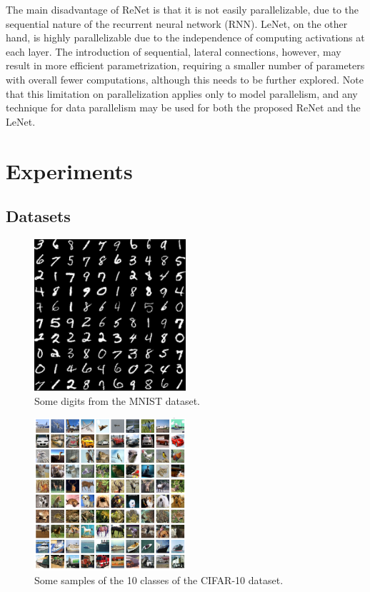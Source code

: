 The main disadvantage of ReNet is that it is not easily parallelizable, due to
the sequential nature of the recurrent neural network (RNN). LeNet, on the
other hand, is highly parallelizable due to the independence of computing
activations at each layer. The introduction of sequential, lateral connections,
however, may result in more efficient parametrization, requiring a smaller
number of parameters with overall fewer computations, although this needs to be
further explored. Note that this limitation on parallelization applies only to
model parallelism, and any technique for data parallelism may be used for both
the proposed ReNet and the LeNet.


\section{Experiments}\label{sec:renet_experiments}

\subsection{Datasets}

\begin{figure}[!t]
    \centering
    \includegraphics[width=0.5\textwidth]{img/renet/mnist_digits.png}
    \caption{Some digits from the MNIST dataset.}
    \label{fig:mnist_digits}
\end{figure}

\begin{figure}[!t]
    \centering
    \includegraphics[width=0.5\textwidth]{img/renet/cifar-10.png}
    \caption{Some samples of the 10 classes of the CIFAR-10 dataset.}
    \label{fig:cifar}
\end{figure}

